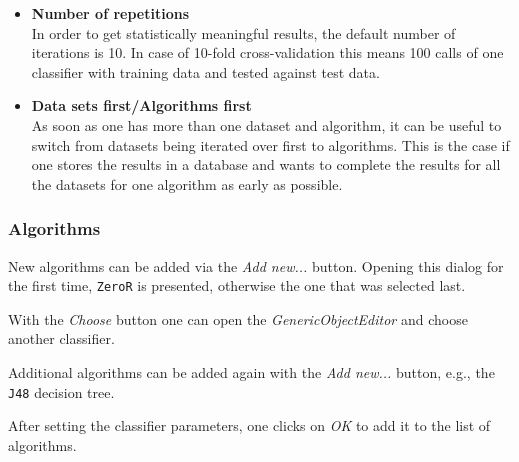 \documentclass[a4paper]{article}
\begin{document}
\begin{itemize}
   \item \textbf{Number of repetitions} \\
      In order to get statistically meaningful results, the default number of iterations is 10. In case of 10-fold cross-validation this means 100 calls of one classifier with training data and tested against test data. 

   \item \textbf{Data sets first/Algorithms first} \\
      As soon as one has more than one dataset and algorithm, it can be useful to switch from datasets being iterated over first to algorithms. This is the case if one stores the results in a database and wants to complete the results for all the datasets for one algorithm as early as possible. 
\end{itemize}


\subsubsection{Algorithms}

New algorithms can be added via the \textit{Add new...} button. Opening this dialog for the first time, \texttt{ZeroR} is presented, otherwise the one that was selected last.

\begin{center}
\end{center}


With the \textit{Choose} button one can open the \textit{GenericObjectEditor} and choose another classifier.

\begin{center}
\end{center}


Additional algorithms can be added again with the \textit{Add new...} button, e.g., the \texttt{J48} decision tree.

\begin{center}
\end{center}


After setting the classifier parameters, one clicks on \textit{OK} to add it to the list of algorithms.

\begin{center}
\end{center}
\end{document}
